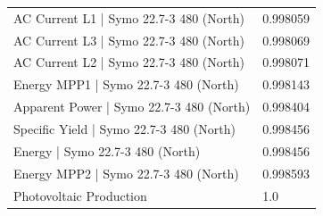 \documentclass[a4paper,12pt]{article}
\begin{document}
\begin{table}[H]
\begin{tabular}{ll}
AC Current L1 | Symo 22.7-3 480 (North) & 0.998059 \\
AC Current L3 | Symo 22.7-3 480 (North) & 0.998069 \\
AC Current L2 | Symo 22.7-3 480 (North) & 0.998071 \\
Energy MPP1 | Symo 22.7-3 480 (North) & 0.998143 \\
Apparent Power | Symo 22.7-3 480 (North) & 0.998404 \\
Specific Yield | Symo 22.7-3 480 (North) & 0.998456 \\
Energy | Symo 22.7-3 480 (North) & 0.998456 \\
Energy MPP2 | Symo 22.7-3 480 (North) & 0.998593 \\
Photovoltaic Production & 1.0 \\

\bottomrule
\end{tabular}
\label{tab:correlations}
\end{table}
\end{document}
